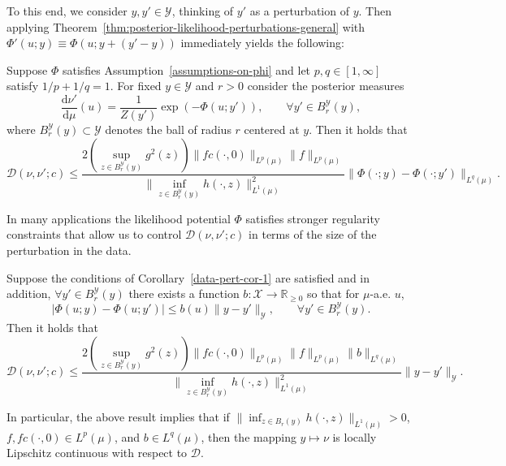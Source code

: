 \documentclass[final]{siamart171218}
\newcommand{\fh}[1]{{\color{blue} #1}}
\newcommand{\mcl}{\mathcal}
\newcommand{\mbb}{\mathbb}
\newcommand{\dd}{\text{d}}
\newcommand{\mX}{\mcl{X}}
\newcommand{\mY}{\mcl{Y}}
\newcommand{\K}{\mathcal{D}}
\begin{document}
To this end, we consider  $y, y' \in \mY$, thinking of $y'$ as a perturbation of
$y$. Then applying Theorem~\ref{thm:posterior-likelihood-perturbations-general}
with $\Phi'(u;y) \equiv \Phi( u; y + (y' -y))$ immediately yields
the following:

\begin{corollary}\label{data-pert-cor-1}
  Suppose $\Phi$ satisfies Assumption~\ref{assumptions-on-phi}  and
  let $p,q \in [1, \infty]$ satisfy $1/p + 1/q = 1$.
  For fixed $y \in \mY$ and $r >0$ consider the posterior measures
  \begin{equation*}
    \frac{\dd \nu'}{\dd \mu} (u) = \frac{1}{Z(y')} \exp( - \Phi(u; y')), \qquad \forall y' \in B^\mY_r(y),
  \end{equation*}
  where $B^\mY_r(y) \subset \mY$ denotes the ball of radius $r$ centered at $y$.
  Then it holds that
  \begin{equation*}
    \K(\nu, \nu'; c) \le \frac{2 \left( \sup_{z \in B^\mY_r(y)}  g^2(z) \right)
      \| f c(\cdot, 0) \|_{L^p(\mu)} \| f \|_{L^p(\mu)} }{ \| \inf_{z \in B^\mY_r(y)} h(\cdot, z) \|_{L^1(\mu)}^2}
    \| \Phi(\cdot; y) - \Phi(\cdot; y') \|_{L^q(\mu)}.
  \end{equation*}
\end{corollary}

In many applications the likelihood potential $\Phi$ satisfies stronger regularity constraints
that allow  us to control  $\K(\nu, \nu'; c)$ in terms of the size of the
perturbation in the data. 

\begin{corollary}
	\label{data-pert-cor-2}
 Suppose the conditions of Corollary~\ref{data-pert-cor-1} are satisfied
  and in addition,
  $\forall y' \in B^\mY_r(y)$ there 
  exists a function $b: \mX \to \mbb R_{\ge 0}$ so that for $\mu$-a.e. $u$,
  \begin{equation*}
    | \Phi(u; y) - \Phi(u; y') | \le b(u) \| y - y'\|_\mY, \qquad \forall y' \in B^\mY_r(y). 
  \end{equation*}
  Then it holds that
  \begin{equation*}
      \K(\nu, \nu'; c) \le \frac{2 \left( \sup_{z \in B^\mY_r(y)}  g^2(z) \right)
      \| f c(\cdot, 0) \|_{L^p(\mu)} \| f \|_{L^p(\mu)} \| b \|_{L^q(\mu)} }{ \| \inf_{z \in B^\mY_r(y)} h(\cdot, z) \|_{L^1(\mu)}^2} \| y - y' \|_{\mY}.
  \end{equation*}
\end{corollary}
In particular, the above result implies that if
$\| \inf_{z \in B_r(y)} h(\cdot, z) \|_{L^1(\mu)} >0$, $f, f c(\cdot, 0) \in L^p(\mu)$, 
and $b \in L^q(\mu)$,
then the  mapping $y \mapsto \nu$  is locally Lipschitz continuous with respect to $\K$. 
\end{document}
